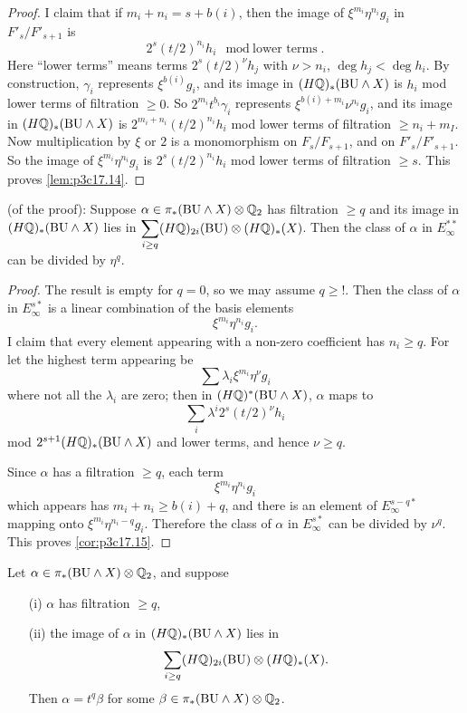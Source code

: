 \documentclass[../main]{subfiles}
\begin{document}
\begin{proof}
I claim that if $m_i + n_i = s + b(i)$, then the image of $\xi^{m_i} \eta^{n_i} g_i$ in $F'_s/F'_{s + 1}$ is $$2^s (t/2)^{n_i} h_i \mod \text{lower terms}.$$ Here ``lower terms'' means terms $2^s(t/2)^\nu h_j$ with $\nu > n_i$, $\deg h_j < \deg h_i$. By construction, $\gamma_i$ represents $\xi^{b(i)} g_i$, and its image in $(H\mathbb{Q})_\ast(\mathrm{BU} \wedge X)$ is $h_i$ mod lower terms of filtration $\ge 0$. So $2^{m_i} t^{b_i} \gamma_i$ represents $\xi^{b(i) + m_i} \nu^{n_i} g_i$, and its image in $(H \mathbb{Q})_\ast(\mathrm{BU} \wedge X)$ is $2^{m_i + n_i}(t/2)^{n_i} h_i$ mod lower terms of filtration $\ge n_i + m_I$. Now multiplication by $\xi$ or $2$ is a monomorphism on $F_s/F_{s + 1}$, and on $F'_s/F'_{s + 1}$. So the image of $\xi^{m_i} \eta^{n_i} g_i$ is $2^s(t/2)^{n_i} h_i$ mod lower terms of filtration $\ge s$. This proves \ref{lem:p3c17.14}. 
\end{proof}

\begin{corollary}
\label{cor:p3c17.15}
(of the proof): Suppose $\alpha \in \pi_\ast(\mathrm{BU} \wedge X) \otimes \mathbb{Q}_2$ has filtration $\ge q$ and its image in $(H\mathbb{Q})_\ast(\mathrm{BU} \wedge X)$ lies in $\displaystyle \sum_{i \ge q} (H \mathbb{Q})_{2i}(\mathrm{BU}) \otimes (H \mathbb{Q})_\ast(X)$. Then the class of $\alpha$ in $E_\infty^{\ast \ast}$ can be divided by $\eta^q$. 
\end{corollary}
\begin{proof}
The result is empty for $q = 0$, so we may assume $q \ge !$. Then the class of $\alpha$ in $E_\infty^{s\ast}$ is a linear combination of the basis elements $$\xi^{m_i} \eta^{n_i} g_i.$$ I claim that every element appearing with a non-zero coefficient has $n_i \ge q$. For let the highest term appearing be $$\sum \lambda_i \xi^{m_i} \eta^\nu g_i$$ where not all the $\lambda_i$ are zero; then in $(H\mathbb{Q})^\ast(\mathrm{BU} \wedge X)$, $\alpha$ maps to $$\sum_i \lambda^i 2^s (t/2)^\nu h_i$$ mod $2^{s + 1}(H \mathbb{Q})_\ast(\mathrm{BU} \wedge X)$ and lower terms, and hence $\nu \ge q$.

Since $\alpha$ has a filtration $\ge q$, each term $$\xi^{m_i} \eta^{n_i} g_i$$ which appears has $m_i + n_i \ge b(i) + q$, and there is an element of $E_\infty^{s - q\ast}$ mapping onto $\xi^{m_i} \eta^{n_i - q}g_i$. Therefore the class of $\alpha$ in $E^{s\ast}_\infty$ can be divided by $\nu^q$. This proves \ref{cor:p3c17.15}. 
\end{proof}

\begin{lemma}
\label{lem:p3c17.16}
Let $\alpha \in \pi_\ast(\mathrm{BU} \wedge X) \otimes \mathbb{Q}_2$, and suppose 

\begin{enumerate}
    \item[(i)] $\alpha$ has filtration $\ge q$, 
    \item[(ii)] the image of $\alpha$ in $(H \mathbb{Q})_\ast(\mathrm{BU} \wedge X)$ lies in $$\sum_{i \ge q} (H \mathbb{Q})_{2i}(\mathrm{BU}) \otimes (H \mathbb{Q})_\ast(X).$$ Then $\alpha = t^q \beta$ for some $\beta \in \pi_\ast(\mathrm{BU} \wedge X) \otimes \mathbb{Q}_2$.
\end{enumerate}
\end{lemma}
\end{document}
